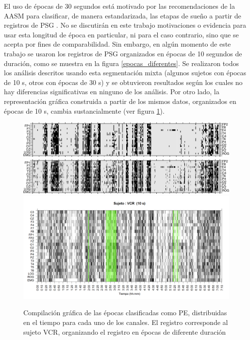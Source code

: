 El uso de épocas de 30 segundos está motivado por las recomendaciones de la AASM para 
clasificar, de manera estandarizada, las etapas de sueño a partir de registros de PSG 
\cite{AASM07}. 
No se discutirán en este trabajo motivaciones o evidencia para usar esta longitud de época en 
particular, ni para el caso contrario, sino que se acepta por fines de comparabilidad. 
Sin embargo, en algún momento de este trabajo se usaron los registros de PSG organizados en 
épocas de 10 segundos de duración, como se muestra en la figura \ref{epocas_diferentes}. 
Se realizaron todos los análisis descritos usando esta segmentación mixta (algunos sujetos con 
épocas de 10 s, otros con épocas de 30 s) y se obtuvieron resultados según los cuales no hay 
diferencias significativas en ninguno de los análisis. 
Por otro lado, la representación gráfica construida a partir de los mismos datos, organizados
en épocas de 10 s, cambia sustancialmente (ver figura \ref{comp_VCR}).

\begin{figure}
\centering
\includegraphics[width=0.9\linewidth] 
{./img_ejemplos/VCNNS1_est_60.png} 
\\
\includegraphics[width=0.9\linewidth]
{./img_ejemplos/VCNNS1_est_30.png} 
\\
\includegraphics[width=0.9\linewidth]
{./img_ejemplos/VCNNS1_est_10.png} 
\caption{Compilación gráfica de las épocas clasificadas como PE, distribuidas en el tiempo
para cada uno de los canales. El registro corresponde al sujeto VCR, organizando el registro en
épocas de diferente duración}
\label{comp_VCR}
\end{figure}

